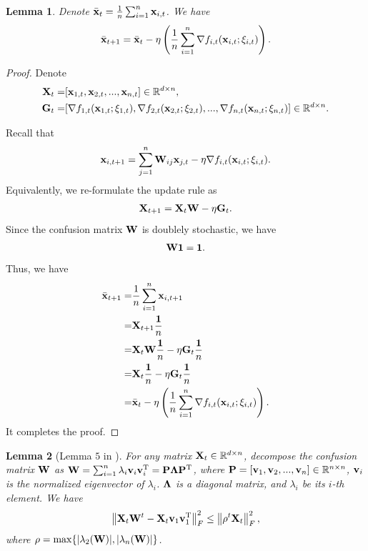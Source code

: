 \documentclass{article}
\newtheorem{Lemma}{\bf{Lemma}}
\begin{document}
\begin{Lemma}
\label{Lemma_average_update_rule}
Denote $\bar{{\bf x}}_t = \frac{1}{n}\sum_{i=1}^n {\bf x}_{i,t}$. We have
\begin{align}
\nonumber
\bar{{\bf x}}_{t+1} =  \bar{{\bf x}}_{t} - \eta \left( \frac{1}{n} \sum_{i=1}^n \nabla f_{i,t}({\bf x}_{i,t};\xi_{i,t}) \right). 
\end{align}
\end{Lemma}
\begin{proof}
Denote
\begin{align}
\nonumber
{\bf X}_t = &  [{\bf x}_{1,t}, {\bf x}_{2,t}, ..., {\bf x}_{n,t}] \in \mathbb{R}^{d\times n}, \\ \nonumber
{\bf G}_t = & [\nabla f_{1,t}({\bf x}_{1,t};\xi_{1,t}), \nabla f_{2,t}({\bf x}_{2,t};\xi_{2,t}), ..., \nabla f_{n,t}({\bf x}_{n,t};\xi_{n,t})] \in \mathbb{R}^{d\times n}.
\end{align}

Recall that 
\begin{align}
\nonumber
{\bf x}_{i,t+1} = \sum_{j=1}^n {\bf W}_{ij}{\bf x}_{j,t} - \eta \nabla f_{i,t}({\bf x}_{i,t};\xi_{i,t}).
\end{align} Equivalently, we re-formulate the update rule as
\begin{align}
\nonumber
{\bf X}_{t+1} = {\bf X}_{t}{\bf W} - \eta {\bf G}_t.
\end{align} Since the confusion matrix ${\bf W}$ is doublely stochastic, we have
\begin{align}
\nonumber
{\bf W} {\bf 1} = {\bf 1}.
\end{align} Thus, we have
\begin{align}
\nonumber
\bar{{\bf x}}_{t+1} = & \frac{1}{n}\sum_{i=1}^n {\bf x}_{i,t+1} \\ \nonumber
= & {\bf X}_{t+1}\frac{{\bf 1}}{n} \\ \nonumber 
= & {\bf X}_{t}{\bf W}\frac{{\bf 1}}{n} - \eta {\bf G}_t\frac{{\bf 1}}{n} \\ \nonumber
= & {\bf X}_{t}\frac{{\bf 1}}{n} - \eta {\bf G}_t\frac{{\bf 1}}{n} \\ \nonumber
=& \bar{{\bf x}}_{t} - \eta \left( \frac{1}{n} \sum_{i=1}^n \nabla f_{i,t}({\bf x}_{i,t};\xi_{i,t}) \right). 
\end{align} It completes the proof.
\end{proof}

\begin{Lemma}[Lemma $5$ in \citep{Tang:2018un}]
\label{Lemma_hanlin_1}
For any matrix ${\bf X}_t\in\mathbb{R}^{d\times n}$, decompose the confusion matrix ${\bf W}$ as ${\bf W} = \sum_{i=1}^n \lambda_i {\bf v}_i {\bf v}_i^{\rm T} = {\bf P} \mathbf{\Lambda} {\bf P}^{\rm T}$, where ${\bf P} = [{\bf v}_1, {\bf v}_2, ..., {\bf v}_n]\in\mathbb{R}^{n\times n}$, ${\bf v}_i$ is the normalized eigenvector of $\lambda_i$. $\mathbf{\Lambda}$ is a diagonal matrix, and $\lambda_i$ be its $i$-th element. We have
\begin{align}
\nonumber
\left\lVert{\bf X}_t {\bf W}^t - {\bf X}_t {\bf v}_1 {\bf v}_1^{\rm T} \right\rVert_F^2 \le \left\lVert\rho^t {\bf X}_t\right\rVert_F^2, 
\end{align} where  $\rho = \max \{| \lambda_2({\bf W}) |, | \lambda_n({\bf W}) |\}$. 

\end{Lemma}
\end{document}
